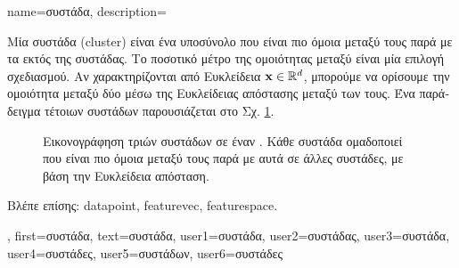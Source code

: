 {name={\foreignlanguage{greek}{συστάδα}}, 
	description={\foreignlanguage{greek}{Μία συστάδα} (cluster) \foreignlanguage{greek}{είναι ένα υποσύνολο}
		 \foreignlanguage{greek}{που είναι πιο όμοια μεταξύ τους παρά με τα}  
		\foreignlanguage{greek}{εκτός της συστάδας. Το ποσοτικό μέτρο της ομοιότητας μεταξύ} 
		 \foreignlanguage{greek}{είναι μία επιλογή σχεδιασμού. Αν}  
		\foreignlanguage{greek}{χαρακτηρίζονται από Ευκλείδεια}  ${\bf x} \in \mathbb{R}^{d}$, 
		\foreignlanguage{greek}{μπορούμε να ορίσουμε την ομοιότητα μεταξύ δύο}  \foreignlanguage{greek}{μέσω της 
		Ευκλείδειας απόστασης μεταξύ των}  \foreignlanguage{greek}{τους. Ένα παράδειγμα τέτοιων συστάδων 
		παρουσιάζεται στο Σχ.} \ref{fig:clusters_dict}.\\
		\begin{figure}[H]
		\centering
		{
		\caption{\foreignlanguage{greek}{Εικονογράφηση τριών συστάδων σε έναν}  . 
		\foreignlanguage{greek}{Κάθε συστάδα ομαδοποιεί}  \foreignlanguage{greek}{που είναι πιο όμοια μεταξύ τους 
		παρά με αυτά σε άλλες συστάδες, με βάση την Ευκλείδεια απόσταση.} }
		\label{fig:clusters_dict} }
		\end{figure}
		\foreignlanguage{greek}{Βλέπε επίσης:} \gls{datapoint}, \gls{featurevec}, \gls{featurespace}.},
	first={\foreignlanguage{greek}{συστάδα}},
	text={\foreignlanguage{greek}{συστάδα}},
	user1={\foreignlanguage{greek}{συστάδα}}, %
	user2={\foreignlanguage{greek}{συστάδας}}, %
	user3={\foreignlanguage{greek}{συστάδα}}, %
	user4={\foreignlanguage{greek}{συστάδες}}, %
	user5={\foreignlanguage{greek}{συστάδων}}, %
	user6={\foreignlanguage{greek}{συστάδες}} %
}


